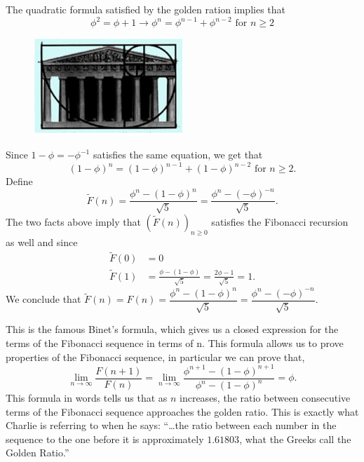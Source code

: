 

The quadratic formula satisfied by the golden ration implies that
	\[
	\phi^2=\phi+1 \longrightarrow \phi^n=\phi^{n-1}+\phi^{n-2} \text{ for } n \geq 2
	\]

	\begin{figure}[H]
	\centering
	\includegraphics[width=0.5\textwidth]{../sections/seasons/season1/102/images/parthenon.png} 
	\end{figure}


Since $1-\phi= - \phi^{-1}$ satisfies the same equation, we get that
	\[
	(1-\phi)^n= (1 - \phi)^{n-1} + (1 - \phi)^{n-2} \text{ for } n \geq 2.
	\]
Define
	\[
	\widetilde{F}(n)= \frac{\phi^n - (1 - \phi)^n}{\sqrt{5}}= \frac{\phi^n - (-\phi)^{-n}}{\sqrt{5}}.
	\]
The two facts above imply that  $(\widetilde{F}(n))_{n \geq 0}$ satisfies the Fibonacci recursion as well and since
	\[
	\begin{split}
	\widetilde{F}(0)&= 0 \\
	\widetilde{F}(1)&= \frac{\phi - (1 - \phi)}{\sqrt{5}} = \frac{2\phi - 1}{\sqrt{5}} = 1.
	\end{split}
	\]
We conclude that $\widetilde{F}(n)=F(n)=\dfrac{\phi^n-(1-\phi)^n}{\sqrt{5}}=\dfrac{\phi^n-(-\phi)^{-n}}{\sqrt{5}}$. 




This is the famous \textcolor{CornellRed}{Binet's formula}, which gives us a closed expression for the terms of the Fibonacci sequence in terms of n. This formula allows us to prove properties of the Fibonacci sequence, in particular we can prove that,
	\[
	\lim_{n \to \infty} \frac{F(n+1)}{F(n)} = \lim_{n \to \infty} \frac{\phi^{n+1} - (1-\phi)^{n+1}}{\phi^n - (1 - \phi)^n} = \phi.
	\]
This formula in words tells us that as $n$ increases, the ratio between consecutive terms of the Fibonacci sequence approaches the golden ratio. This is exactly what Charlie is referring to when he says: ``\dots the ratio between each number in the sequence to the one before it is approximately $1.61803$, what the Greeks call the Golden Ratio.''